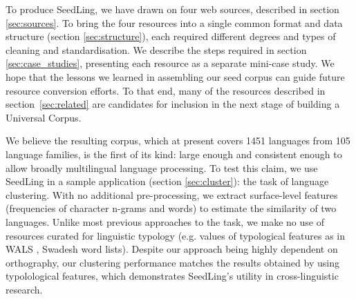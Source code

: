 To produce SeedLing, we have drawn on four web sources, described in section \ref{sec:sources}. To bring the four resources into a single common format and data structure (section \ref{sec:structure}), each required different degrees and types of cleaning and standardisation. We describe the steps required in section \ref{sec:case_studies}, presenting each resource as a separate mini-case study. We hope that the lessons we learned in assembling our seed corpus can guide future resource conversion efforts. To that end, many of the resources described in section~\ref{sec:related} are candidates for inclusion in the next stage of building a Universal Corpus.

We believe the resulting corpus, which at present covers 1451 languages from 105 language families, is the first of its kind: large enough and consistent enough to allow broadly multilingual language processing. To test this claim, we use SeedLing in a sample application (section \ref{sec:cluster}): the task of language clustering. With no additional pre-processing, we extract surface-level features (frequencies of character n-grams and words) to estimate the similarity of two languages. Unlike most previous approaches to the task, we make no use of resources curated for linguistic typology (e.g. values of typological features as in WALS \cite{wals}, Swadesh word lists). Despite our approach being highly dependent on orthography, our clustering performance matches the results obtained by  using typolological features, which demonstrates SeedLing's utility in cross-linguistic research.